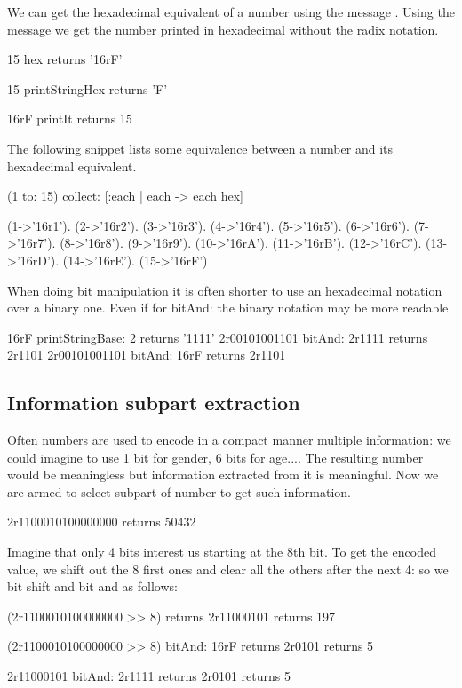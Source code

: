 \documentclass[a4paper,10pt,twoside]{book}
\begin{document}
We can get the hexadecimal equivalent of a number using the message . 
Using the message  we get the number printed in hexadecimal without the radix notation. 

\begin{code}{}
15 hex
	returns '16rF'
	
15 printStringHex 
	returns 'F'

16rF printIt
	returns 15
\end{code}

The following snippet lists some equivalence between a number and its hexadecimal equivalent.
\begin{code}
(1 to: 15) collect: [:each | each -> each hex] 

{(1->'16r1'). (2->'16r2'). (3->'16r3'). (4->'16r4'). (5->'16r5'). (6->'16r6'). (7->'16r7'). (8->'16r8'). (9->'16r9'). (10->'16rA'). (11->'16rB'). (12->'16rC'). (13->'16rD'). (14->'16rE'). (15->'16rF')}
\end{code}

When doing bit manipulation it is often shorter to use an hexadecimal notation over a binary one. Even if for bitAnd: the binary notation may be more readable
\begin{code}{}
16rF printStringBase: 2
	returns '1111'
2r00101001101 bitAnd: 2r1111	
	returns 2r1101
2r00101001101 bitAnd: 16rF
	returns 2r1101
\end{code}


\subsection*{Information subpart extraction}
Often numbers are used to encode in a compact manner multiple information: we could imagine to use 1 bit for gender, 6 bits for age.... The resulting number would be meaningless but information extracted from it is meaningful.
Now we are armed to select subpart of number to get such information. 

\begin{code}{}
2r1100010100000000 
	returns 50432
\end{code}

Imagine that only 4 bits interest us starting at the 8th bit.
To get the encoded value, we shift out the 8 first ones and clear all the others after the next 4: so we bit shift and bit and as follows:

\begin{code}{}
(2r1100010100000000 >> 8)
	returns 2r11000101
	returns 197

(2r1100010100000000 >> 8) bitAnd: 16rF	
	returns 2r0101	
	returns 5
	
2r11000101 bitAnd: 2r1111
	returns 2r0101	
	returns 5
\end{code}
\end{document}
